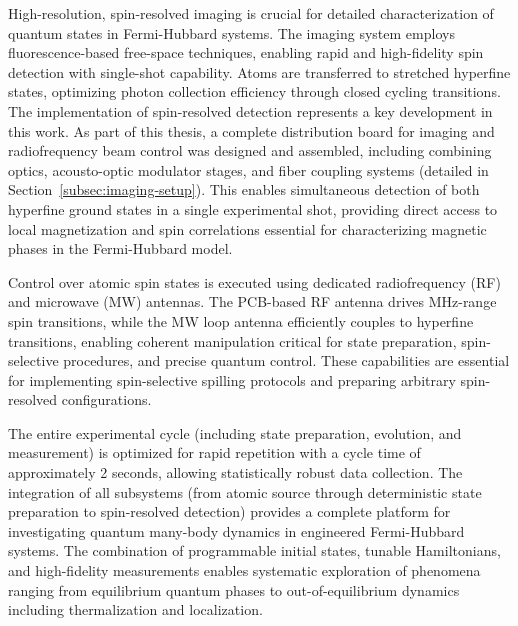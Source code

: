 High-resolution, spin-resolved imaging is crucial for detailed characterization of quantum states in Fermi-Hubbard systems. The imaging system employs fluorescence-based free-space techniques, enabling rapid and high-fidelity spin detection with single-shot capability. Atoms are transferred to stretched hyperfine states, optimizing photon collection efficiency through closed cycling transitions. The implementation of spin-resolved detection represents a key development in this work. As part of this thesis, a complete distribution board for imaging and radiofrequency beam control was designed and assembled, including combining optics, acousto-optic modulator stages, and fiber coupling systems (detailed in Section~\ref{subsec:imaging-setup}). This enables simultaneous detection of both hyperfine ground states in a single experimental shot, providing direct access to local magnetization and spin correlations essential for characterizing magnetic phases in the Fermi-Hubbard model.

Control over atomic spin states is executed using dedicated radiofrequency (RF) and microwave (MW) antennas. The PCB-based RF antenna drives MHz-range spin transitions, while the MW loop antenna efficiently couples to hyperfine transitions, enabling coherent manipulation critical for state preparation, spin-selective procedures, and precise quantum control. These capabilities are essential for implementing spin-selective spilling protocols and preparing arbitrary spin-resolved configurations.

The entire experimental cycle (including state preparation, evolution, and measurement) is optimized for rapid repetition with a cycle time of approximately 2 seconds, allowing statistically robust data collection. The integration of all subsystems (from atomic source through deterministic state preparation to spin-resolved detection) provides a complete platform for investigating quantum many-body dynamics in engineered Fermi-Hubbard systems. The combination of programmable initial states, tunable Hamiltonians, and high-fidelity measurements enables systematic exploration of phenomena ranging from equilibrium quantum phases to out-of-equilibrium dynamics including thermalization and localization.


